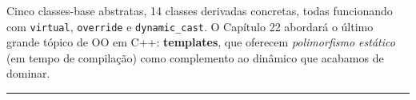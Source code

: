 \documentclass[11pt,a4paper]{article}
\begin{document}
Cinco classes-base abstratas, 14 classes derivadas concretas, todas funcionando com \texttt{virtual}, \texttt{override} e \texttt{dynamic\_cast}. O Cap\'itulo 22 abordar\'a o \'ultimo grande t\'opico de OO em C++: \textbf{templates}, que oferecem \emph{polimorfismo est\'atico} (em tempo de compila\c{c}\~ao) como complemento ao din\^amico que acabamos de dominar.

\vspace{1em}
\begin{center}\rule{0.5\textwidth}{0.4pt}\end{center}
\end{document}
